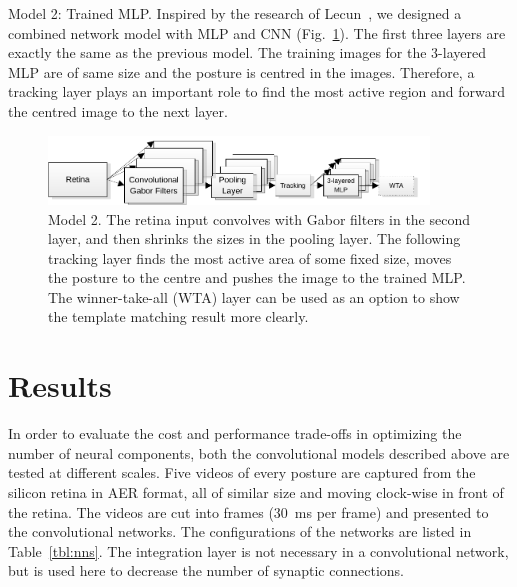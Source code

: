 Model 2: Trained MLP. 
Inspired by the research of Lecun~\cite{lecun1998gradient}, we designed a combined network model with MLP and CNN (Fig.~\ref{fig:model2}). 
The first three layers are exactly the same as the previous model.
The training images for the 3-layered MLP are of same size and the posture is centred in the images.
Therefore, a tracking layer plays an important role to find the most active region and forward the centred image to the next layer.

\begin{figure}
\centering
	\includegraphics[width=0.9\textwidth]{pics_icann/model2.pdf}
	\caption{Model 2. 
	The retina input convolves with Gabor filters in the second layer, and then shrinks the sizes in the pooling layer.
	The following tracking layer finds the most active area of some fixed size, moves the posture to the centre and pushes the image to the trained MLP.
	The winner-take-all (WTA) layer can be used as an option to show the template matching result more clearly.}
	\label{fig:model2}
\end{figure}


\section{Results}

In order to evaluate the cost and performance trade-offs in optimizing the number of neural components, both the convolutional models described above are tested at different scales. 
Five videos of every posture are captured from the silicon retina in AER format, all of similar size and moving clock-wise in front of the retina. 
The videos are cut into frames (30~ms per frame) and presented to the convolutional networks. 
The configurations of the networks are listed in Table~\ref{tbl:nns}.
The integration layer is not necessary in a convolutional network, but is used here to decrease the number of synaptic connections.

